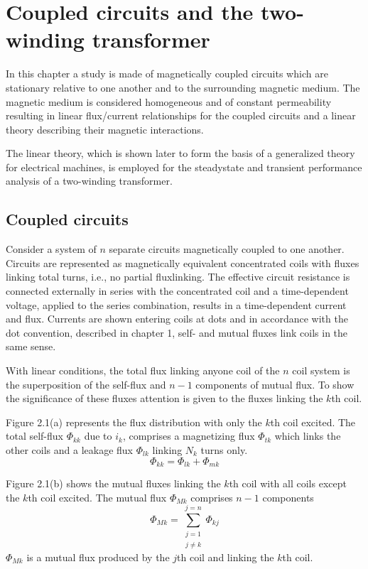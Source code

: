 \documentclass[a4paper,numbers=noenddot,12pt]{scrbook}
\begin{document}
        \chapter{Coupled circuits and the two-winding transformer}
        In this chapter a study is made of magnetically coupled circuits which are stationary relative to one another and to the surrounding magnetic medium. The magnetic medium is considered homogeneous and of constant permeability resulting in linear flux/current relationships for the coupled circuits and a linear theory describing their 
        magnetic interactions.

        The linear theory, which is shown later to form the basis of a generalized theory for electrical machines, is employed for the steady­state and transient performance analysis of a two-winding transformer.

        \section{Coupled circuits}
        Consider a system of $n$ separate circuits magnetically coupled to one another. Circuits are represented as magnetically equivalent concentrated coils with fluxes linking total turns, i.e., no partial flux­linking. The effective circuit resistance is connected externally in series with the concentrated coil and a time-dependent voltage, applied to the series combination, results in a time-dependent current and flux. Currents are shown entering coils at dots and in accordance with the dot convention, described in chapter 1, self- and mutual fluxes link coils in the same sense.

        With linear conditions, the total flux linking anyone coil of the $n$ coil system is the superposition of the self-flux and $n - 1$ components of mutual flux. To show the significance of these fluxes attention is given to the fluxes linking the $k$th coil.

        Figure 2.1(a) represents the flux distribution with only the $k$th coil excited. The total self-flux $\Phi_{kk}$ due to $i_k$, comprises a magnetizing flux $\Phi_{tk}$ which links the other coils and a leakage flux $\Phi_{lk}$ linking $N_k$ turns only.
        \begin{equation}
            \Phi_{kk} = \Phi_{lk} + \Phi_{mk}
            \label{eq:Eq2.1}
        \end{equation}

        Figure 2.1(b) shows the mutual fluxes linking the $k$th coil with all coils except the $k$th coil excited. The mutual flux $\Phi_{Mk}$ comprises $n - 1$ components
        \begin{equation}
            \Phi_{Mk} = \sum_{\substack{j = 1\\j \neq k}}^{j = n} \Phi_{kj}
            \label{eq:Eq2.2}
        \end{equation}
        $\Phi_{Mk}$ is a mutual flux produced by the $j$th coil and linking the $k$th coil.
\end{document}
